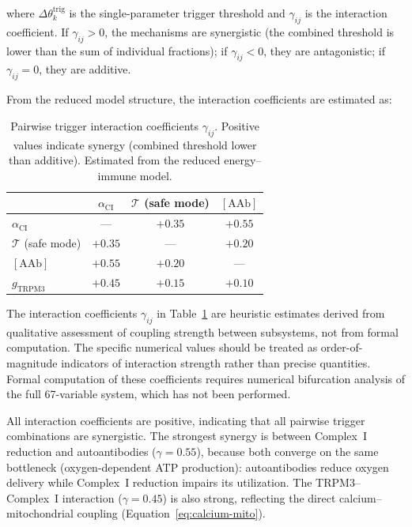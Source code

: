 where $\Delta\theta_k^{\mathrm{trig}}$ is the single-parameter trigger threshold and $\gamma_{ij}$ is the interaction coefficient. If $\gamma_{ij} > 0$, the mechanisms are synergistic (the combined threshold is lower than the sum of individual fractions); if $\gamma_{ij} < 0$, they are antagonistic; if $\gamma_{ij} = 0$, they are additive.

From the reduced model structure, the interaction coefficients are estimated as:

\begin{table}[htbp]
\centering
\caption{Pairwise trigger interaction coefficients $\gamma_{ij}$. Positive values indicate synergy (combined threshold lower than additive). Estimated from the reduced energy--immune model.}
\label{tab:trigger-interactions}
\begin{tabular}{lccc}
\hline
 & $\alpha_{\text{CI}}$ & $\mathcal{T}$ (safe mode) & $[\text{AAb}]$ \\
\hline
$\alpha_{\text{CI}}$ & --- & $+0.35$ & $+0.55$ \\
$\mathcal{T}$ (safe mode) & $+0.35$ & --- & $+0.20$ \\
$[\text{AAb}]$ & $+0.55$ & $+0.20$ & --- \\
$g_{\text{TRPM3}}$ & $+0.45$ & $+0.15$ & $+0.10$ \\
\hline
\end{tabular}
\end{table}

\begin{limitation}
\label{lim:interaction-coefficient-estimates}
The interaction coefficients $\gamma_{ij}$ in Table~\ref{tab:trigger-interactions} are heuristic estimates derived from qualitative assessment of coupling strength between subsystems, not from formal computation. The specific numerical values should be treated as order-of-magnitude indicators of interaction strength rather than precise quantities. Formal computation of these coefficients requires numerical bifurcation analysis of the full 67-variable system, which has not been performed.
\end{limitation}

All interaction coefficients are positive, indicating that all pairwise trigger combinations are synergistic. The strongest synergy is between Complex~I reduction and autoantibodies ($\gamma = 0.55$), because both converge on the same bottleneck (oxygen-dependent ATP production): autoantibodies reduce oxygen delivery while Complex~I reduction impairs its utilization. The TRPM3--Complex~I interaction ($\gamma = 0.45$) is also strong, reflecting the direct calcium--mitochondrial coupling (Equation~\ref{eq:calcium-mito}).

